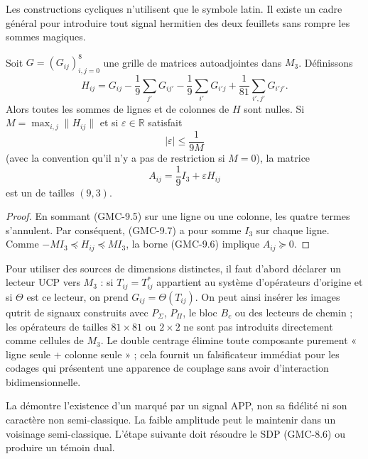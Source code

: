 Les constructions cycliques n'utilisent que le symbole latin. Il existe un cadre
général pour introduire tout signal hermitien des deux feuillets sans
rompre les sommes magiques.

\begin{proposition}
\label{gmc:prop:doble-centrado}
Soit $G=(G_{ij})_{i,j=0}^{8}$ une grille de matrices autoadjointes dans
$M_3$. Définissons
\[
 H_{ij}=G_{ij}
 -\frac19\sum_{j'}G_{ij'}
 -\frac19\sum_{i'}G_{i'j}
 +\frac1{81}\sum_{i',j'}G_{i'j'}.
 \tag{GMC-9.5}
\]
Alors toutes les sommes de lignes et de colonnes de $H$ sont nulles. Si
$M=\max_{i,j}\|H_{ij}\|$ et si $\varepsilon\in\mathbb R$ satisfait
\[
 |\varepsilon|\le\frac1{9M}
 \tag{GMC-9.6}
\]
(avec la convention qu'il n'y a pas de restriction si $M=0$), la matrice
\[
 A_{ij}=\frac19I_3+\varepsilon H_{ij}
 \tag{GMC-9.7}
\]
est un \QMS de tailles $(9,3)$.
\end{proposition}

\begin{proof}
En sommant \textup{(GMC-9.5)} sur une ligne ou une colonne, les quatre termes s'annulent.
Par conséquent, \textup{(GMC-9.7)} a pour somme $I_3$ sur chaque ligne. Comme
$-MI_3\preceq H_{ij}\preceq MI_3$, la borne \textup{(GMC-9.6)} implique
$A_{ij}\succeq0$.
\end{proof}

Pour utiliser des sources de dimensions distinctes, il faut d'abord déclarer un lecteur
UCP vers $M_3$ : si $T_{ij}=T_{ij}^*$ appartient au système d'opérateurs
d'origine et si $\Theta$ est ce lecteur, on prend $G_{ij}=\Theta(T_{ij})$. On peut ainsi
insérer les images qutrit de signaux construits avec $P_\Sigma$,
$P_\Pi$, le bloc $B_c$ ou des lecteurs de chemin ; les opérateurs de tailles
$81\times81$ ou $2\times2$ ne sont pas introduits directement comme cellules de
$M_3$. Le double centrage
élimine toute composante purement « ligne seule + colonne seule » ; cela fournit
un falsificateur immédiat pour les codages qui présentent une apparence de couplage sans
avoir d'interaction bidimensionnelle.

\begin{controlbox}
La  démontre l'existence d'un \QMS marqué par un signal APP,
non sa fidélité ni son caractère non semi-classique. La faible amplitude peut le maintenir
dans un voisinage semi-classique. L'étape suivante doit résoudre le SDP
\textup{(GMC-8.6)} ou produire un témoin dual.
\end{controlbox}

